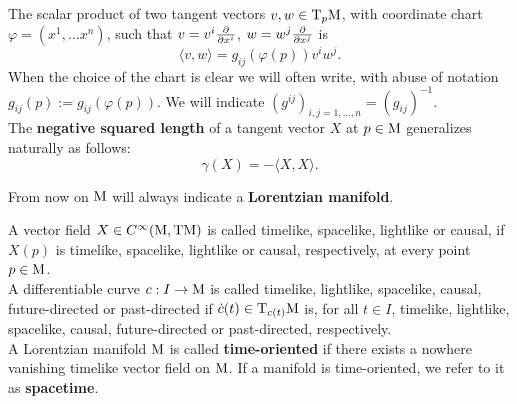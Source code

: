 The scalar product of two tangent vectors $v,w\in\mathrm{T}_p\mathrm{M}$, with coordinate chart $\varphi=(x^1,\dots x^n)$, such that $v=v^i\frac{\partial  }{\partial x^i}$, $w=w^j\frac{\partial  }{\partial x^j}$ is
\[ \langle v,w\rangle=g_{ij}(\varphi(p))v^iw^j.   \]
When the choice of the chart is clear we will often write, with abuse of notation $g_{ij}(p):=g_{ij}(\varphi(p))$. We will indicate $(g^{ij})_{i,j=1,\dots, n}=(g_{ij})^{-1}$.\\

\noindent The \textbf{negative squared length} of a tangent vector $X$ at $p\in\mathrm{M}$ generalizes naturally as follows:
\begin{equation}
	\gamma(X)=-\langle X,X\rangle.
	\label{eq:gamma}
\end{equation}

\noindent From now on $\mathrm{M}$ will always indicate a \textbf{Lorentzian manifold}.

\begin{definition}
		A vector field $X\in C^\infty (\mathrm{M},\mathrm{T}\mathrm{M})$ is called timelike, spacelike, lightlike or causal, if $X (p)$ is timelike, spacelike, lightlike or causal, respectively, at every point $p\in\mathrm{M}$.\\
		
		\noindent A differentiable curve $c : I\to\mathrm{M}$ is called timelike, lightlike,
		spacelike, causal, future-directed or past-directed if $\dot{c}(t)\in\mathrm{T}_{c(t)}\mathrm{M}$ is, for all $t\in I$, timelike, lightlike, spacelike, causal,
		future-directed or past-directed, respectively.\\
		
		\noindent A Lorentzian manifold $\mathrm{M}$ is called \textbf{time-oriented} if there exists a nowhere vanishing timelike vector field on $\mathrm{M}$. If a manifold is time-oriented, we refer to it as \textbf{spacetime}.
\end{definition}


